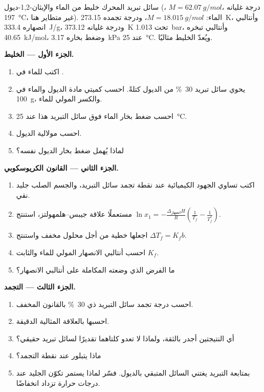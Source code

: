 \begin{problem}
\label{pb:b2:chemical-potential:1}
سائل تبريد المحرك خليط من الماء والإيثان-1,2-ديول
(، $M = \qty{62.07}{g/mol}$، درجة غليانه \qty{197}{\celsius}،
غير متطاير هنا). الماء: $M = \qty{18.015}{g/mol}$، ودرجة تجمده
\qty{273.15}{K}، وأنتالبي انصهاره \qty{333.4}{J/g}، ودرجة غليانه
\qty{373.12}{K} تحت \qty{1.013}{bar}، وأنتالبي تبخره
\qty{40.65}{kJ/mol}، وضغط بخاره \qty{3.17}{kPa} عند \qty{25}{\celsius}.
ويُعدّ الخليط مثاليًا.

\medskip
\noindent\textbf{الجزء الأول --- الخليط.}
\begin{enumerate}
  \item اكتب  للماء في .
  \item يحوي سائل تبريد \qty{30}{\percent} من الديول كتلةً. احسب
        كميتي مادة الديول والماء في \qty{100}{g}، والكسر المولي
        للماء.
  \item احسب ضغط بخار الماء فوق سائل التبريد هذا عند
        \qty{25}{\celsius}.
  \item احسب مولالية الديول.
  \item لماذا يُهمل ضغط بخار الديول نفسه؟
\end{enumerate}

\medskip
\noindent\textbf{الجزء الثاني --- القانون الكريوسكوبي.}
\begin{enumerate}[resume]
  \item اكتب تساوي الجهود الكيميائية عند نقطة تجمد سائل التبريد،
        والجسم الصلب جليد نقي.
  \item مستعملًا علاقة جيبس--هلمهولتز، استنتج $\ln x_1 =
        -\frac{\Delta_{\text{انصهار}}H}{R}\left(\frac1{T_f} - \frac1{T_f^*}\right)$.
  \item اجعلها خطية من أجل محلول مخفف واستنتج $\Delta T_f = K_f b$.
  \item احسب أنتالبي الانصهار المولي للماء والثابت $K_f$.
  \item ما الفرض الذي وضعته المكاملة على أنتالبي
        الانصهار؟
\end{enumerate}

\medskip
\noindent\textbf{الجزء الثالث --- التجمد.}
\begin{enumerate}[resume]
  \item احسب درجة تجمد سائل التبريد ذي \qty{30}{\percent} بالقانون
        المخفف.
  \item احسبها بالعلاقة المثالية الدقيقة.
  \item أي النتيجتين أجدر بالثقة، ولماذا لا تعدو كلتاهما تقديرًا لسائل
        تبريد حقيقي؟
  \item ماذا يتبلور عند نقطة التجمد؟
  \item بمتابعة التبريد يغتني السائل المتبقي بالديول. فسّر
        لماذا يستمر تكوّن الجليد عند درجات حرارة تزداد انخفاضًا.
\end{enumerate}


\end{problem}
